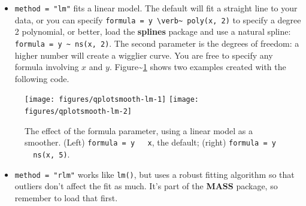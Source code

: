 \begin{itemize}
\itemsep1pt\parskip0pt
\item
  \texttt{method = "lm"} fits a linear model. The default will fit a
  straight line to your data, or you can specify
  \texttt{formula = y \textbackslash{}verb\textbar{}\textasciitilde{}\textbar{} poly(x, 2)}
  to specify a degree 2 polynomial, or better, load the \textbf{splines}
  package and use a natural spline:
  \texttt{formula = y \textasciitilde{} ns(x, 2)}. The second parameter
  is the degrees of freedom: a higher number will create a wigglier
  curve. You are free to specify any formula involving $x$ and $y$.
  Figure\textasciitilde{}\ref{fig:smooth-lm} shows two examples created
  with the following code. 
\end{itemize}

\begin{Shaded}
\begin{Highlighting}[]
  \NormalTok{(}\NormalTok{, }\NormalTok{), }
   \NormalTok{)}
  \NormalTok{(}\NormalTok{, }\NormalTok{), }
   \NormalTok{, } \StringTok{ }\NormalTok{))}
\end{Highlighting}
\end{Shaded}

\begin{figure}
\texttt{[image: figures/qplotsmooth-lm-1]} \texttt{[image: figures/qplotsmooth-lm-2]} \caption{The effect of the formula parameter, using a linear model as a smoother.  (Left) \texttt{formula = y ~ x}, the default; (right) \texttt{formula = y ~ ns(x, 5)}.\label{fig:smooth-lm}}
\end{figure}

\begin{itemize}
\itemsep1pt\parskip0pt
\item
  \texttt{method = "rlm"} works like \texttt{lm()}, but uses a robust
  fitting algorithm so that outliers don't affect the fit as much. It's
  part of the \textbf{MASS} package, so remember to load that first.
   
\end{itemize}

